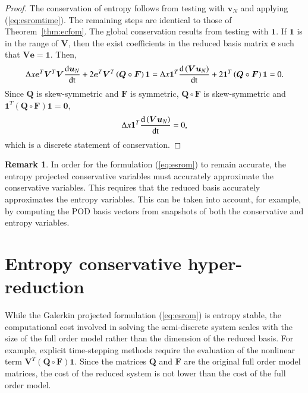 \documentclass[preprint,10pt]{elsarticle}
\theoremstyle{definition}
\theoremstyle{lemma}
\newtheorem*{remark}{Remark}
\theoremstyle{theorem}
\theoremstyle{assumption}
\newcommand{\td}[2]{\frac{{\rm d}#1}{{\rm d}{\rm #2}}}
\newcommand{\LRp}[1]{\left( #1 \right)}
\begin{document}
\begin{proof}
The conservation of entropy follows from testing with $\bm{v}_N$ and applying (\ref{eq:esromtime}).  The remaining steps are identical to those of Theorem~\ref{thm:ecfom}.  The global conservation results from testing with $\bm{1}$.  If $\bm{1}$ is in the range of $\bm{V}$, then the exist coefficients in the reduced basis matrix $\bm{e}$ such that $\bm{V}\bm{e}=\bm{1}$.  Then, 
\begin{align*}
\Delta x\bm{e}^T\bm{V}^T\bm{V}\td{\bm{u}_N}{t} + 2\bm{e}^T\bm{V}^T\LRp{\bm{Q}\circ \bm{F}}\bm{1}  = \Delta x\bm{1}^T\td{\LRp{\bm{V}\bm{u}_N}}{t} + 2\bm{1}^T\LRp{\bm{Q}\circ \bm{F}}\bm{1} = 0.
\end{align*}
Since $\bm{Q}$ is skew-symmetric and $\bm{F}$ is symmetric, $\bm{Q} \circ \bm{F}$ is skew-symmetric and $\bm{1}^T\LRp{\bm{Q}\circ \bm{F}}\bm{1} = \bm{0}$, 
\[
\Delta x\bm{1}^T\td{\LRp{\bm{V}\bm{u}_N}}{t} = 0,
\]
which is a discrete statement of conservation.
\end{proof}

\begin{remark}
In order for the formulation (\ref{eq:esrom}) to remain accurate, the entropy projected conservative variables must accurately approximate the conservative variables.  This requires that the reduced basis accurately approximates the entropy variables.  This can be taken into account, for example, by computing the POD basis vectors from snapshots of both the conservative and entropy variables.
\end{remark}


\section{Entropy conservative hyper-reduction}
\label{sec:4}
While the Galerkin projected formulation (\ref{eq:esrom}) is entropy stable, the computational cost involved in solving the semi-discrete system scales with the size of the full order model rather than the dimension of the reduced basis.  For example, explicit time-stepping methods require the evaluation of the nonlinear term $\bm{V}^T\LRp{\bm{Q} \circ \bm{F}}\bm{1}$.  Since the matrices $\bm{Q}$ and $\bm{F}$ are the original full order model matrices, the cost of the reduced system is not lower than the cost of the full order model.  
\end{document}
